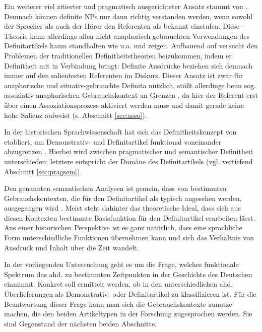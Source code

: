 Ein weiterer viel zitierter und pragmatisch ausgerichteter Ansatz stammt von \textcite{Christophersen1939}. Demnach können definite NPs nur dann richtig verstanden werden, wenn sowohl der Sprecher als auch der Hörer den Referenten als bekannt einstufen. Diese -Theorie kann allerdings allen nicht anaphorisch gebrauchten Verwendungen des Definitartikels kaum standhalten wie u.a. \textcite{Hawkins1978} und \textcite{Lobner1985} zeigen. Aufbauend auf \textcite{Lewis1970} versucht \textcite{vonHeusinger1996} den Problemen der traditionellen Definitheitstheorien beizukommen, indem er Definitheit mit  in Verbindung bringt: Definite Ausdrücke beziehen sich demnach immer auf den salientesten Referenten im Diskurs. Dieser Ansatz ist zwar für anaphorische und situativ-gebrauchte Definita nützlich, stößt allerdings beim sog. assoziativ-anaphorischen Gebrauchskontext an Grenzen \parencite[s. auch][144--149]{Cui2014}, da hier der Referent erst über einen Assoziationsprozess aktiviert werden muss und damit gerade keine hohe Salienz aufweist (s. Abschnitt \ref{sec:asso}).

In der historischen Sprachwissenschaft hat sich das Definitheitskonzept von \textcite{Lobner1985} etabliert, um Demonstrativ- und Definitartikel funktional voneinander abzugrenzen \parencite{Demske2001,Szczepaniak2011a,Schlachter2015}. Hierbei wird zwischen pragmatischer und semantischer Definitheit unterschieden; letztere entspricht der Domäne des Definitartikels (vgl. vertiefend Abschnitt \ref{sec:pragsem}). 

Den genannten  semantischen Analysen ist gemein, dass von bestimmten Gebrauchskontexten, die für den Definitartikel als typisch angesehen werden, ausgegangen wird \parencite[9]{Cui2014}. Meist steht dahinter das theoretische Ideal, dass sich aus diesen Kontexten  bestimmte Basisfunktion für den Definitartikel erarbeiten lässt. Aus einer historischen Perspektive ist es ganz natürlich, dass eine sprachliche Form unterschiedliche Funktionen übernehmen kann und sich das Verhältnis von Ausdruck und Inhalt über die Zeit wandelt. 

In der vorliegenden Untersuchung geht es um die Frage, welches funktionale Spektrum das ahd.  zu bestimmten Zeitpunkten in der Geschichte des Deutschen einnimmt. Konkret soll ermittelt werden, ob  in den unterschiedlichen ahd. Überlieferungen als Demonstrativ- oder Definitartikel zu klassifizieren ist. Für die Beantwortung dieser Frage kann man sich die Gebrauchskontexte zunutze machen, die den beiden Artikeltypen in der Forschung zugesprochen werden. Sie sind Gegenstand der nächsten beiden Abschnitte. 


